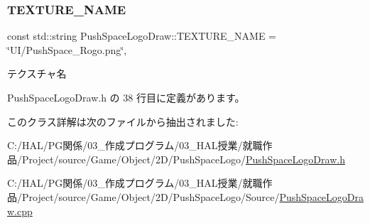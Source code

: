 \subsubsection{\texorpdfstring{T\+E\+X\+T\+U\+R\+E\+\_\+\+N\+A\+ME}{TEXTURE\_NAME}}
{\footnotesize\ttfamily const std\+::string Push\+Space\+Logo\+Draw\+::\+T\+E\+X\+T\+U\+R\+E\+\_\+\+N\+A\+ME = \char`\"{}UI/Push\+Space\+\_\+\+Rogo.\+png\char`\"{}\hspace{0.3cm}{\ttfamily [static]}, {\ttfamily [private]}}



テクスチャ名 



 Push\+Space\+Logo\+Draw.\+h の 38 行目に定義があります。



このクラス詳解は次のファイルから抽出されました\+:\begin{DoxyCompactItemize}
\item 
C\+:/\+H\+A\+L/\+P\+G関係/03\+\_\+作成プログラム/03\+\_\+\+H\+A\+L授業/就職作品/\+Project/source/\+Game/\+Object/2\+D/\+Push\+Space\+Logo/\mbox{\hyperlink{_push_space_logo_draw_8h}{Push\+Space\+Logo\+Draw.\+h}}\item 
C\+:/\+H\+A\+L/\+P\+G関係/03\+\_\+作成プログラム/03\+\_\+\+H\+A\+L授業/就職作品/\+Project/source/\+Game/\+Object/2\+D/\+Push\+Space\+Logo/\+Source/\mbox{\hyperlink{_push_space_logo_draw_8cpp}{Push\+Space\+Logo\+Draw.\+cpp}}\end{DoxyCompactItemize}
